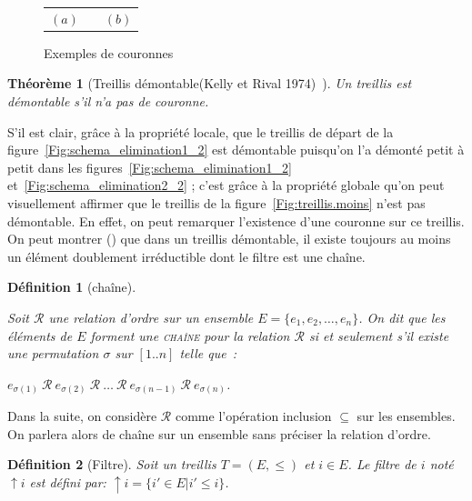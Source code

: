 \documentclass[a4paper]{report}
\newtheorem{definition}{Définition}[chapter]
\newtheorem{theorem}{Théorème}[chapter]
\begin{document}
\begin{figure}
\begin{center}
\begin{tabular}{c p{0.5cm} c}
 \\
    $(a)$   & & $(b)$   \\
\end{tabular}

\end{center}
\caption{Exemples de couronnes}
\label{fig:crown}
\end{figure}

\begin{theorem}[Treillis démontable(Kelly et Rival 1974)~\cite{kelly-rival74}]

\label{treillisdemontable}
Un treillis est démontable s'il n'a pas de couronne.
\end{theorem}


S'il est clair, grâce à la propriété locale, que le treillis de départ de la figure~\ref{Fig:schema_elimination1_2} est démontable puisqu'on l'a démonté 
petit à petit dans les figures~\ref{Fig:schema_elimination1_2} et~\ref{Fig:schema_elimination2_2} ; c'est grâce à la propriété globale qu'on peut visuellement affirmer que le 
treillis de la figure~\ref{Fig:treillis.moins} n'est pas démontable. En effet, on peut remarquer l'existence d'une couronne sur ce treillis.
On peut montrer (\cite{crow_free}) que dans un treillis démontable, il existe toujours au moins un élément 
doublement irréductible dont le filtre est une chaîne.

\begin{definition}[chaîne]

\label{chaine}

Soit $\mathcal{R}$ une relation d'ordre sur un ensemble $E = \{e_1, e_2, \hdots ,e_n\}$.
On dit que les éléments de $E$ forment une \textsc{chaîne} pour la relation $\mathcal{R}$ si et seulement s'il existe une permutation $\sigma$ sur $[1..n]$
 telle que~:

$e_{\sigma(1)}~\mathcal{R}~e_{\sigma(2)}~\mathcal{R}~\hdots~\mathcal{R}~e_{\sigma(n-1)}~\mathcal{R}~e_{\sigma(n)}$.
\end{definition}

Dans la suite, on considère $\mathcal{R}$ comme l'opération inclusion $\subseteq$ sur les ensembles. On parlera alors de chaîne sur un ensemble sans 
préciser la relation d'ordre.

\begin{definition}[Filtre]

\label{filtre}
Soit un treillis $T = (E, \leq)$ et $i \in E$. Le filtre de $i$ noté $\uparrow i$ est défini par: $\uparrow i =\{i' \in E | i' \leq i \}$.
\end{definition}
\end{document}
